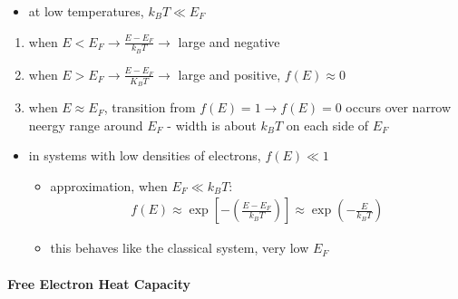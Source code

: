 \documentclass[a4paper,11pt,normalem]{article}
\begin{document}
\begin{itemize}
    \item at low temperatures, \(k_BT \ll E_F\)
\end{itemize}
\begin{enumerate}
    \item when \(E < E_F \to \frac{E - E_F}{k_BT} \to\) large and negative
    \item when \(E > E_F \to \frac{E - E_F}{K_BT} \to\) large and positive, \(f(E) \approx 0\)
    \item when \(E \approx E_F\), transition from \(f(E) = 1 \to f(E) = 0\) occurs over narrow neergy range around \(E_F\) - width is about \(k_BT\) on each side of \(E_F\)
\end{enumerate}
\begin{itemize}
    \item in systems with low densities of electrons, \(f(E) \ll 1\)
        \begin{itemize}
            \item approximation, when \(E_F \ll k_BT\):
                \begin{align*}
                    f(E) \approx \exp\left[-\left(\frac{E - E_F}{k_BT}\right)\right] \approx \exp\left(-\frac{E}{k_BT}\right)
                \end{align*}
            \item this behaves like the classical system, very low \(E_F\)
        \end{itemize}
\end{itemize}

\paragraph{Free Electron Heat Capacity}
\end{document}
